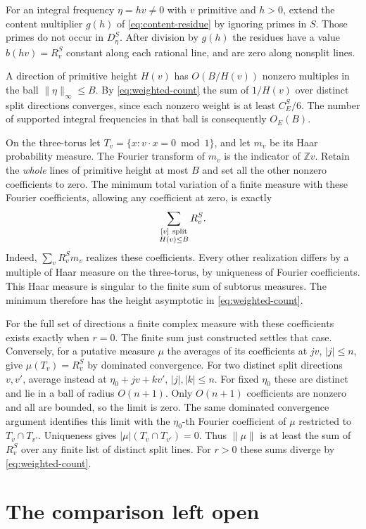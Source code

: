 \documentclass[11pt]{article}
\begin{document}
For an integral frequency $\eta=hv\ne0$ with $v$ primitive and $h>0$,
extend the content multiplier $g(h)$ of \eqref{eq:content-residue}
by ignoring primes in $S$. Those primes do not occur in $D_\eta^S$.
After division by $g(h)$ the residues have a value $b(hv)=R_v^S$
constant along each rational line, and are zero along nonsplit lines.

A direction of primitive height $H(v)$ has $O(B/H(v))$ nonzero
multiples in the ball $\|\eta\|_\infty\le B$. By \eqref{eq:weighted-count}
the sum of $1/H(v)$ over distinct split directions converges, since
each nonzero weight is at least $C_E^S/6$. The number of supported
integral frequencies in that ball is consequently $O_E(B)$.

On the three-torus let $T_v=\{x:v\cdot x=0\bmod1\}$, and let $m_v$
be its Haar probability measure. The Fourier transform of $m_v$ is
the indicator of $\mathbb Z v$. Retain the \emph{whole} lines of
primitive height at most $B$ and set all the other nonzero coefficients
to zero. The minimum total variation of a finite measure with these
Fourier coefficients, allowing any coefficient at zero, is exactly
\[
 \sum_{\substack{[v]\ {\rm split}\\H(v)\le B}}R_v^S .
\]
Indeed, $\sum_v R_v^S m_v$ realizes these coefficients. Every other
realization differs by a multiple of Haar measure on the three-torus,
by uniqueness of Fourier coefficients. This Haar measure is singular
to the finite sum of subtorus measures. The minimum therefore has the
height asymptotic in \eqref{eq:weighted-count}.

For the full set of directions a finite complex measure with these
coefficients exists exactly when $r=0$. The finite sum just constructed
settles that case. Conversely, for a putative measure $\mu$ the averages
of its coefficients at $jv$, $|j|\le n$, give $\mu(T_v)=R_v^S$ by
dominated convergence. For two distinct split directions $v,v'$,
average instead at $\eta_0+jv+kv'$, $|j|,|k|\le n$. For fixed $\eta_0$
these are distinct and lie in a ball of radius $O(n+1)$. Only $O(n+1)$
coefficients are nonzero and all are bounded, so the limit is zero.
The same dominated convergence argument identifies this limit with
the $\eta_0$-th Fourier coefficient of $\mu$ restricted to
$T_v\cap T_{v'}$. Uniqueness gives $|\mu|(T_v\cap T_{v'})=0$.
Thus $\|\mu\|$ is at least the sum of $R_v^S$ over any finite list of
distinct split lines. For $r>0$ these sums diverge by
\eqref{eq:weighted-count}.

\section{The comparison left open}
\end{document}
